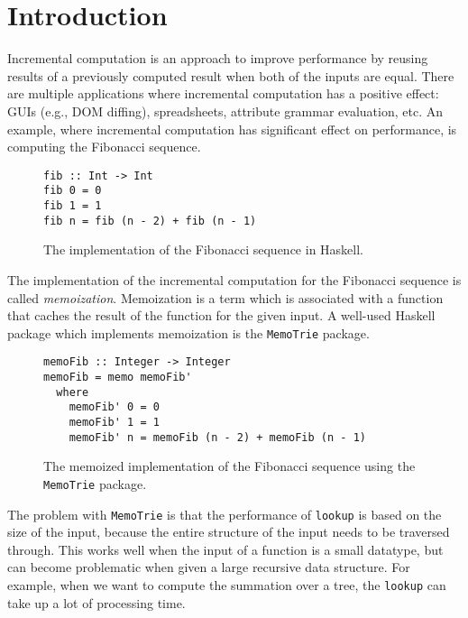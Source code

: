 \chapter{Introduction}


Incremental computation is an approach to improve performance by reusing results of a previously computed result when both of the inputs are equal. There are multiple applications where incremental computation has a positive effect: GUIs (e.g., DOM diffing), spreadsheets, attribute grammar evaluation, etc.  An example, where incremental computation has significant effect on performance, is computing the Fibonacci sequence.

\begin{figure}[H]
\captionsetup{justification=justified,singlelinecheck=false,margin=0cm}
\begin{verbatim}
fib :: Int -> Int
fib 0 = 0
fib 1 = 1
fib n = fib (n - 2) + fib (n - 1)
\end{verbatim}
\caption{The implementation of the Fibonacci sequence in Haskell.}
\label{fig-fib-alg}
\end{figure}

The implementation of the incremental computation for the Fibonacci sequence is called \textit{memoization}. Memoization is a term which is associated with a function that caches the result of the function for the given input. A well-used Haskell package which implements memoization is the \texttt{MemoTrie} package\cite*{hackage2022memotrie}.

\begin{figure}[H]
\captionsetup{justification=justified,singlelinecheck=false,margin=0cm}
\begin{verbatim}
memoFib :: Integer -> Integer
memoFib = memo memoFib'
  where
    memoFib' 0 = 0
    memoFib' 1 = 1
    memoFib' n = memoFib (n - 2) + memoFib (n - 1)
\end{verbatim}
\caption{The memoized implementation\cite*{memotrie2022fibonacci} of the Fibonacci sequence using the \texttt{MemoTrie} package.}
\label{fig-mem-fib-alg}
\end{figure}

The problem with \texttt{MemoTrie} is that the performance of \texttt{lookup} is based on the size of the input, because the entire structure of the input needs to be traversed through. This works well when the input of a function is a small datatype, but can become problematic when given a large recursive data structure. For example, when we want to compute the summation over a tree, the \texttt{lookup} can take up a lot of processing time. 

